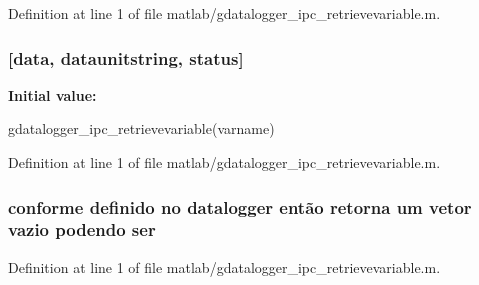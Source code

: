 Definition at line 1 of file matlab/gdatalogger\_\-ipc\_\-retrievevariable.m.
\subsubsection[{function}]{[{\bf data}, {\bf dataunitstring}, {\bf status}]}\label{matlab_2gdatalogger__ipc__retrievevariable_8m_ac132315a15f73d90d100c0d10aaa8c88}
{\bfseries Initial value:}
\begin{DoxyCode}
 gdatalogger_ipc_retrievevariable(varname)
%
% 
\end{DoxyCode}


Definition at line 1 of file matlab/gdatalogger\_\-ipc\_\-retrievevariable.m.
\subsubsection[{ser}]{\setlength{\rightskip}{0pt plus 5cm}conforme definido no datalogger então retorna um vetor vazio podendo {\bf ser}}\label{matlab_2gdatalogger__ipc__retrievevariable_8m_a2865119cb33b58b219255e4beeaa5356}


Definition at line 1 of file matlab/gdatalogger\_\-ipc\_\-retrievevariable.m.